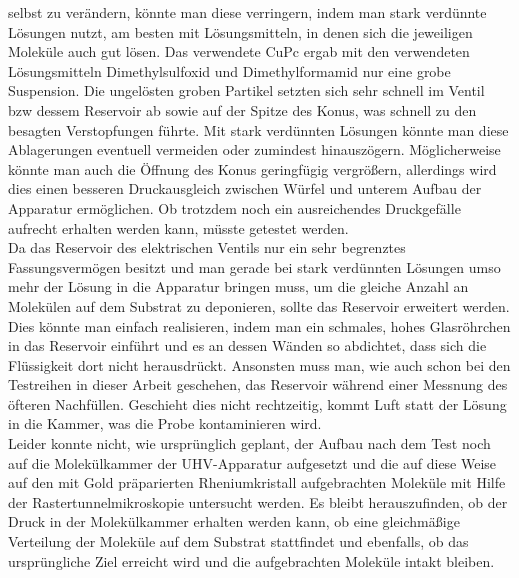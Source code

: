 selbst zu verändern, könnte man diese verringern, indem man stark verdünnte Lösungen nutzt, am
besten mit Lösungsmitteln, in denen sich die jeweiligen Moleküle auch gut lösen. Das verwendete CuPc
ergab mit den verwendeten Lösungsmitteln Dimethylsulfoxid und Dimethylformamid nur eine grobe
Suspension. Die ungelösten groben Partikel setzten sich sehr schnell im Ventil bzw dessem Reservoir
ab sowie auf der Spitze des Konus, was schnell zu den besagten Verstopfungen führte. Mit stark
verdünnten Lösungen könnte man diese Ablagerungen eventuell vermeiden oder zumindest hinauszögern.
Möglicherweise könnte man auch die Öffnung des Konus geringfügig vergrößern, allerdings wird dies
einen besseren Druckausgleich zwischen Würfel und unterem Aufbau der Apparatur ermöglichen. Ob
trotzdem noch ein ausreichendes Druckgefälle aufrecht erhalten werden kann, müsste getestet werden.
\\
Da das Reservoir des elektrischen Ventils nur ein sehr begrenztes Fassungsvermögen besitzt und man
gerade bei stark verdünnten Lösungen umso mehr der Lösung in die Apparatur bringen muss, um die
gleiche Anzahl an Molekülen auf dem Substrat zu deponieren, sollte das Reservoir erweitert werden.
Dies könnte man einfach realisieren, indem man ein schmales, hohes Glasröhrchen in das Reservoir
einführt und es an dessen Wänden so abdichtet, dass sich die Flüssigkeit dort nicht herausdrückt.
Ansonsten muss man, wie auch schon bei den Testreihen in dieser Arbeit geschehen, das Reservoir
während einer Messnung des öfteren Nachfüllen. Geschieht dies nicht rechtzeitig, kommt Luft statt
der Lösung in die Kammer, was die Probe kontaminieren wird.
\\
Leider konnte nicht, wie ursprünglich geplant, der Aufbau nach dem Test noch auf die Molekülkammer
der UHV-Apparatur aufgesetzt und die auf diese Weise auf den mit Gold präparierten Rheniumkristall
aufgebrachten Moleküle mit Hilfe der Rastertunnelmikroskopie untersucht werden. Es bleibt
herauszufinden, ob der Druck in der Molekülkammer erhalten werden kann, ob eine gleichmäßige
Verteilung der Moleküle auf dem Substrat stattfindet und ebenfalls, ob das ursprüngliche Ziel erreicht wird und die aufgebrachten Moleküle intakt bleiben.









